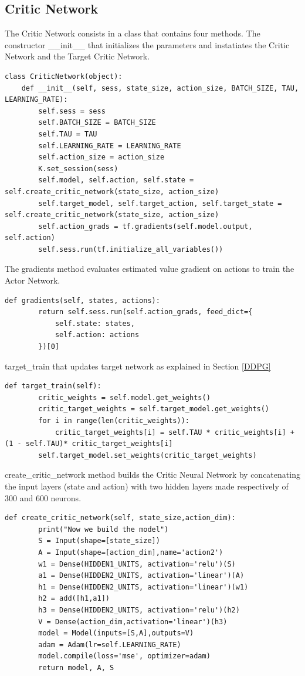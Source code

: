\documentclass[Lau,oneside,noexaminfo]{sapthesis} %
\begin{document}
\subsection{Critic Network}
The Critic Network consists in a class that contains four methods.
The constructor \_\_init\_\_ that initializes the parameters and instatiates the Critic Network and the Target Critic Network.
\begin{lstlisting}
class CriticNetwork(object):
    def __init__(self, sess, state_size, action_size, BATCH_SIZE, TAU, LEARNING_RATE):
        self.sess = sess
        self.BATCH_SIZE = BATCH_SIZE
        self.TAU = TAU
        self.LEARNING_RATE = LEARNING_RATE
        self.action_size = action_size
        K.set_session(sess)
        self.model, self.action, self.state = self.create_critic_network(state_size, action_size)  
        self.target_model, self.target_action, self.target_state = self.create_critic_network(state_size, action_size)  
        self.action_grads = tf.gradients(self.model.output, self.action)
        self.sess.run(tf.initialize_all_variables())
\end{lstlisting}
The gradients method evaluates estimated value gradient on actions to train the Actor Network.
\begin{lstlisting}[firstnumber=13]
    def gradients(self, states, actions):
        return self.sess.run(self.action_grads, feed_dict={
            self.state: states,
            self.action: actions
        })[0]
\end{lstlisting}
target\_train that updates target network as explained in Section \ref{DDPG}
\begin{lstlisting}[firstnumber=18]
    def target_train(self):
        critic_weights = self.model.get_weights()
        critic_target_weights = self.target_model.get_weights()
        for i in range(len(critic_weights)):
            critic_target_weights[i] = self.TAU * critic_weights[i] + (1 - self.TAU)* critic_target_weights[i]
        self.target_model.set_weights(critic_target_weights)
\end{lstlisting}
create\_critic\_network method builds the Critic Neural Network by concatenating the input layers (state and action) with two hidden layers made respectively of 300 and 600 neurons.
\begin{lstlisting}[firstnumber=24]
    def create_critic_network(self, state_size,action_dim):
        print("Now we build the model")
        S = Input(shape=[state_size])  
        A = Input(shape=[action_dim],name='action2')   
        w1 = Dense(HIDDEN1_UNITS, activation='relu')(S)
        a1 = Dense(HIDDEN2_UNITS, activation='linear')(A) 
        h1 = Dense(HIDDEN2_UNITS, activation='linear')(w1)
        h2 = add([h1,a1])    
        h3 = Dense(HIDDEN2_UNITS, activation='relu')(h2)
        V = Dense(action_dim,activation='linear')(h3)   
        model = Model(inputs=[S,A],outputs=V)
        adam = Adam(lr=self.LEARNING_RATE)
        model.compile(loss='mse', optimizer=adam)
        return model, A, S 
\end{lstlisting}
\end{document}
